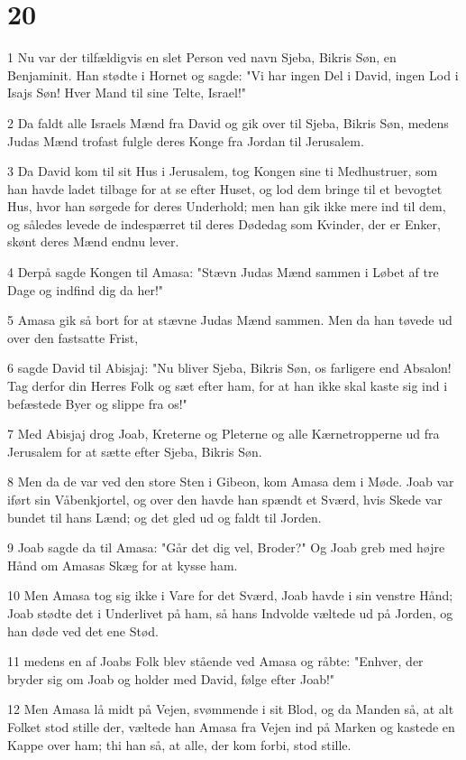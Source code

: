\chapter{20}

\par 1 Nu var der tilfældigvis en slet Person ved navn Sjeba, Bikris Søn, en Benjaminit. Han stødte i Hornet og sagde: "Vi har ingen Del i David, ingen Lod i Isajs Søn! Hver Mand til sine Telte, Israel!"
\par 2 Da faldt alle Israels Mænd fra David og gik over til Sjeba, Bikris Søn, medens Judas Mænd trofast fulgle deres Konge fra Jordan til Jerusalem.
\par 3 Da David kom til sit Hus i Jerusalem, tog Kongen sine ti Medhustruer, som han havde ladet tilbage for at se efter Huset, og lod dem bringe til et bevogtet Hus, hvor han sørgede for deres Underhold; men han gik ikke mere ind til dem, og således levede de indespærret til deres Dødedag som Kvinder, der er Enker, skønt deres Mænd endnu lever.
\par 4 Derpå sagde Kongen til Amasa: "Stævn Judas Mænd sammen i Løbet af tre Dage og indfind dig da her!"
\par 5 Amasa gik så bort for at stævne Judas Mænd sammen. Men da han tøvede ud over den fastsatte Frist,
\par 6 sagde David til Abisjaj: "Nu bliver Sjeba, Bikris Søn, os farligere end Absalon! Tag derfor din Herres Folk og sæt efter ham, for at han ikke skal kaste sig ind i befæstede Byer og slippe fra os!"
\par 7 Med Abisjaj drog Joab, Kreterne og Pleterne og alle Kærnetropperne ud fra Jerusalem for at sætte efter Sjeba, Bikris Søn.
\par 8 Men da de var ved den store Sten i Gibeon, kom Amasa dem i Møde. Joab var iført sin Våbenkjortel, og over den havde han spændt et Sværd, hvis Skede var bundet til hans Lænd; og det gled ud og faldt til Jorden.
\par 9 Joab sagde da til Amasa: "Går det dig vel, Broder?" Og Joab greb med højre Hånd om Amasas Skæg for at kysse ham.
\par 10 Men Amasa tog sig ikke i Vare for det Sværd, Joab havde i sin venstre Hånd; Joab stødte det i Underlivet på ham, så hans Indvolde væltede ud på Jorden, og han døde ved det ene Stød.
\par 11 medens en af Joabs Folk blev stående ved Amasa og råbte: "Enhver, der bryder sig om Joab og holder med David, følge efter Joab!"
\par 12 Men Amasa lå midt på Vejen, svømmende i sit Blod, og da Manden så, at alt Folket stod stille der, væltede han Amasa fra Vejen ind på Marken og kastede en Kappe over ham; thi han så, at alle, der kom forbi, stod stille.
